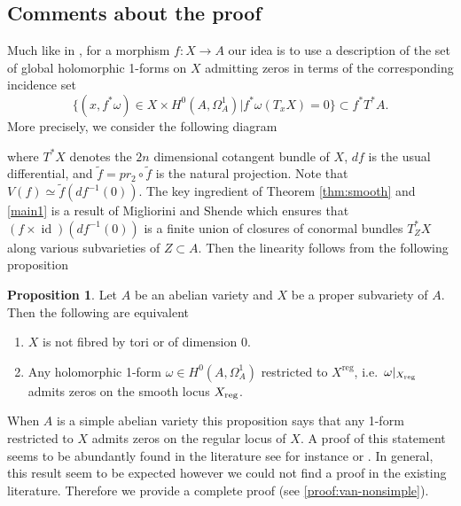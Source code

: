 \documentclass[a4paper,12pt,reqno]{amsart}
\theoremstyle{plain}
\theoremstyle{definition}
\newtheorem{proposition}[theorem]{Proposition}
\theoremstyle{remark}
\newcommand{\id}{\operatorname{id}}
\newcommand{\pr}{\operatorname{pr}}
\DeclareMathOperator{\reg}{reg}
\begin{document}
\subsection{Comments about the proof}
Much like in \cite{PS14}, for a morphism $f: X\to A$ our idea is to use a description of the set of global holomorphic 1-forms
on $X$ admitting zeros
in terms of the corresponding incidence set
\[\{(x,f^*\omega)\in X\times H^0(A,\Omega_A^1)| f^*\omega(T_xX) = 0\} \subset f^*T^*A.\] More
precisely,  we consider the following diagram 
\begin{center}
\end{center}
 where $T^*X$ denotes the $2n$ dimensional 
cotangent bundle of $X$, $df$ is the usual differential, and $\tilde{f} = pr_2\circ \tilde{f}$ is the natural projection. Note that
$V(f) \simeq \tilde{f}(df^{-1}(0))$. 
The key ingredient of 
Theorem \ref{thm:smooth} and \ref{main1} is
a result of Migliorini and Shende \cite[Theorem C]{MiSh18} which ensures that $(f\times\id)(df^{-1}(0))$
is a finite union of closures of conormal bundles
$T^*_ZX$ along various subvarieties of $Z\subset A$.
Then the linearity follows from the following proposition
\begin{proposition}\label{van-nonsimple}
Let $A$ be an abelian variety and $X$ be a proper subvariety of $A$. Then the following are equivalent
\begin{enumerate}
	\item $X$ is not fibred by tori or of dimension 0. 
	\item Any holomorphic 1-form $\omega\in H^0(A, \Omega_A^1)$ restricted to $X^{\reg}$, i.e.\ $\omega|_{X_{\textnormal{reg}}}$ admits zeros on the smooth locus $X_{\textnormal{reg}}$.
\end{enumerate}
\end{proposition}
When $A$ is a
simple abelian variety this proposition says that any 1-form restricted to $X$ admits zeros on the regular locus of $X$. A proof of this statement seems to be abundantly found in the literature
see for instance \cite[Proposition 3.1]{HK05}
or \cite[Proposition 5.12]{LMW20}. In general, this result seem to be expected however we could not find a proof in the existing literature. 
Therefore we provide a complete proof (see \ref{proof:van-nonsimple}).
\end{document}
